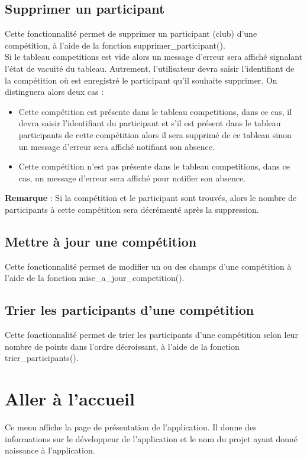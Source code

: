 \documentclass[12pt,a4paper]{report}
\begin{document}
\subsection{Supprimer un participant}
Cette fonctionnalité permet de supprimer un participant (club) d'une compétition, à l'aide de la fonction supprimer\_participant().\\
Si le tableau competitions est vide alors un message d'erreur sera affiché signalant l'état de vacuité du tableau. Autrement, l'utilisateur devra saisir l'identifiant de la compétition où est enregistré le participant qu'il souhaite supprimer. On distinguera alors deux cas : 
\begin{itemize}
	\item Cette compétition est présente dans le tableau competitions, dans ce cas, il devra saisir l'identifiant du participant et s'il est présent dans le tableau participants de cette compétition alors il sera supprimé de ce tableau sinon un message d'erreur sera affiché notifiant son absence.
	\item Cette compétition n'est pas présente dans le tableau competitions, dans ce cas, un message d'erreur sera affiché pour notifier son absence. 
\end{itemize} 
\textbf{Remarque} : Si la compétition et le participant sont trouvés, alors le nombre de participants à cette compétition sera décrémenté après la suppression.

\subsection{Mettre à jour une compétition}
Cette fonctionnalité permet de modifier un ou des champs d'une compétition à l'aide de la fonction mise\_a\_jour\_competition().\\

\subsection{Trier les participants d'une compétition}
Cette fonctionnalité permet de trier les participants d'une compétition selon leur nombre de points dans l'ordre décroissant, à l'aide de la fonction trier\_participants().

\section{Aller à l'accueil}
Ce menu affiche la page de présentation de l'application. Il donne des informations sur le développeur de l'application et le nom du projet ayant donné naissance à l'application.
\end{document}
